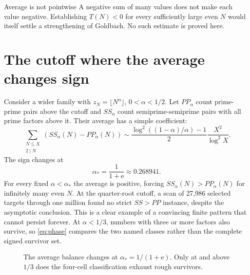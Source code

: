 \documentclass[11pt,a4paper]{article}
\newcommand{\e}{\mathrm e}
\begin{document}
\begin{caution}{Average is not pointwise}
A negative sum of many values does not make each value negative. Establishing $T(N)<0$ for every sufficiently large even $N$ would itself settle a strengthening of Goldbach. No such estimate is proved here.
\end{caution}

\section{The cutoff where the average changes sign}
Consider a wider family with $z_N=\lfloor N^\alpha\rfloor$, $0<\alpha<1/2$. Let $PP_\alpha$ count prime-prime pairs above the cutoff and $SS_\alpha$ count semiprime-semiprime pairs with all prime factors above it. Their average has a simple coefficient:
\begin{equation}\label{eq:phase}
 \sum_{\substack{N\le X\\2\mid N}}(SS_\alpha(N)-PP_\alpha(N))
 \sim\frac{\log^2((1-\alpha)/\alpha)-1}{2}\frac{X^2}{\log^2X}.
\end{equation}
The sign changes at
\[
 \alpha_*=\frac{1}{1+\e}\approx0.268941.
\]
For every fixed $\alpha<\alpha_*$ the average is positive, forcing $SS_\alpha(N)>PP_\alpha(N)$ for infinitely many even $N$. At the quarter-root cutoff, a scan of 27,986 selected targets through one million found no strict $SS>PP$ instance, despite the asymptotic conclusion. This is a clear example of a convincing finite pattern that cannot persist forever. At $\alpha<1/3$, numbers with three or more factors also survive, so \eqref{eq:phase} compares the two named classes rather than the complete signed survivor set.

\begin{figure}[htbp]
\centering
{}
\caption{The average balance changes at $\alpha_*=1/(1+\e)$. Only at and above $1/3$ does the four-cell classification exhaust rough survivors.}
\end{figure}
\end{document}
